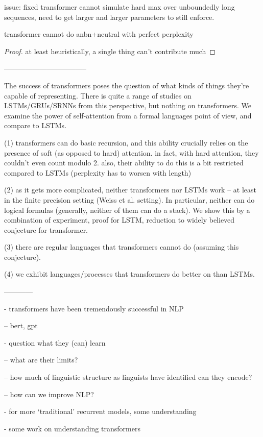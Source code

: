 \documentclass[11pt,a4paper]{article}
\begin{document}
issue: fixed transformer cannot simulate hard max over unboundedly long sequences, need to get larger and larger parameters to still enforce.

transformer cannot do anbn+neutral with perfect perplexity
\begin{proof}
at least heuristically, a single thing can't contribute much
\end{proof}



-----------------------------------

The success of transformers poses the question of what kinds of things they're capable of representing.
There is quite a range of studies on LSTMs/GRUs/SRNNs from this perspective, but nothing on transformers.
We examine the power of self-attention from a formal languages point of view, and compare to LSTMs.

(1) transformers can do basic recursion, and this ability crucially relies on the presence of soft (as opposed to hard) attention. in fact, with hard attention, they couldn't even count modulo 2. also, their ability to do this is a bit restricted compared to LSTMs (perplexity has to worsen with length)

(2) as it gets more complicated, neither transformers nor LSTMs work -- at least in the finite precision setting (Weiss et al. setting).
In particular, neither can do logical formulas (generally, neither of them can do a stack).
We show this by a combination of experiment, proof for LSTM, reduction to widely believed conjecture for transformer.

(3) there are regular languages that transformers cannot do (assuming this conjecture).

(4) we exhibit languages/processes that transformers do better on than LSTMs.



------------

- transformers have been tremendously successful in NLP

-- bert, gpt

- question what they (can) learn 

-- what are their limits?

-- how much of linguistic structure as linguists have identified can they encode?

-- how can we improve NLP?

- for more `traditional' recurrent models, some understanding

- some work on understanding transformers
\end{document}

